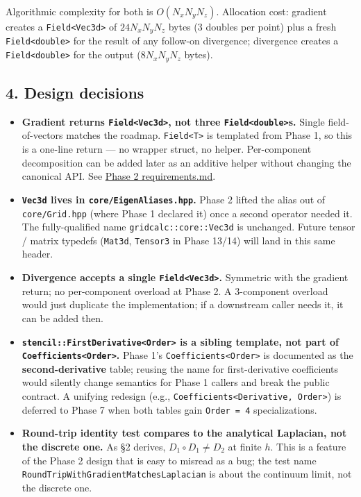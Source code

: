 Algorithmic complexity for both is \(O(N_x N_y N_z)\). Allocation cost:
gradient creates a \passthrough{\lstinline!Field<Vec3d>!} of
\(24 N_x N_y N_z\) bytes (3 doubles per point) plus a fresh
\passthrough{\lstinline!Field<double>!} for the result of any follow-on
divergence; divergence creates a \passthrough{\lstinline!Field<double>!}
for the output (\(8 N_x N_y N_z\) bytes).

\subsection{4. Design decisions}\label{design-decisions}

\begin{itemize}
\tightlist
\item
  \textbf{Gradient returns \passthrough{\lstinline!Field<Vec3d>!}, not
  three \passthrough{\lstinline!Field<double>!}s.} Single
  field-of-vectors matches the roadmap.
  \passthrough{\lstinline!Field<T>!} is templated from Phase 1, so this
  is a one-line return --- no wrapper struct, no helper. Per-component
  decomposition can be added later as an additive helper without
  changing the canonical API. See
  \href{../../../specs/2026-05-02-phase-2-gradient-divergence/requirements.md}{Phase
  2 requirements.md}.
\item
  \textbf{\passthrough{\lstinline!Vec3d!} lives in
  \passthrough{\lstinline!core/EigenAliases.hpp!}.} Phase 2 lifted the
  alias out of \passthrough{\lstinline!core/Grid.hpp!} (where Phase 1
  declared it) once a second operator needed it. The fully-qualified
  name \passthrough{\lstinline!gridcalc::core::Vec3d!} is unchanged.
  Future tensor / matrix typedefs (\passthrough{\lstinline!Mat3d!},
  \passthrough{\lstinline!Tensor3!} in Phase 13/14) will land in this
  same header.
\item
  \textbf{Divergence accepts a single
  \passthrough{\lstinline!Field<Vec3d>!}.} Symmetric with the gradient
  return; no per-component overload at Phase 2. A 3-component overload
  would just duplicate the implementation; if a downstream caller needs
  it, it can be added then.
\item
  \textbf{\passthrough{\lstinline!stencil::FirstDerivative<Order>!} is a
  sibling template, not part of
  \passthrough{\lstinline!Coefficients<Order>!}.} Phase 1's
  \passthrough{\lstinline!Coefficients<Order>!} is documented as the
  \textbf{second-derivative} table; reusing the name for
  first-derivative coefficients would silently change semantics for
  Phase 1 callers and break the public contract. A unifying redesign
  (e.g., \passthrough{\lstinline!Coefficients<Derivative, Order>!}) is
  deferred to Phase 7 when both tables gain
  \passthrough{\lstinline!Order = 4!} specializations.
\item
  \textbf{Round-trip identity test compares to the analytical Laplacian,
  not the discrete one.} As §2 derives, \(D_1 \circ D_1 \ne D_2\) at
  finite \(h\). This is a feature of the Phase 2 design that is easy to
  misread as a bug; the test name
  \passthrough{\lstinline!RoundTripWithGradientMatchesLaplacian!} is
  about the continuum limit, not the discrete one.
\end{itemize}

